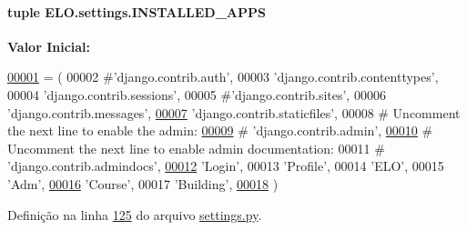 \paragraph[{I\+N\+S\+T\+A\+L\+L\+E\+D\+\_\+\+A\+P\+P\+S}]{\setlength{\rightskip}{0pt plus 5cm}tuple E\+L\+O.\+settings.\+I\+N\+S\+T\+A\+L\+L\+E\+D\+\_\+\+A\+P\+P\+S}\label{namespaceELO_1_1settings_a1a4752075da59d93477195bcc3fc4765}
{\bfseries Valor Inicial\+:}
\begin{DoxyCode}
\hypertarget{namespaceELO_1_1settings_l00001}{}\hyperlink{namespaceELO_1_1settings}{00001} = (
00002     \textcolor{comment}{#'django.contrib.auth',}
00003     \textcolor{stringliteral}{'django.contrib.contenttypes'},
00004     \textcolor{stringliteral}{'django.contrib.sessions'},
00005     \textcolor{comment}{#'django.contrib.sites',}
00006     \textcolor{stringliteral}{'django.contrib.messages'},
\hypertarget{namespaceELO_1_1settings_l00007}{}\hyperlink{namespaceELO_1_1settings_a7730264ddd478343e0f282f36d4a5ab4}{00007}     \textcolor{stringliteral}{'django.contrib.staticfiles'},
00008     \textcolor{comment}{# Uncomment the next line to enable the admin:}
\hypertarget{namespaceELO_1_1settings_l00009}{}\hyperlink{namespaceELO_1_1settings_a62f457ac29cc6f3e85282c71ce3b4f26}{00009}     \textcolor{comment}{# 'django.contrib.admin',}
\hypertarget{namespaceELO_1_1settings_l00010}{}\hyperlink{namespaceELO_1_1settings_a014930e0bf77feccc65c20212593381e}{00010}     \textcolor{comment}{# Uncomment the next line to enable admin documentation:}
00011     \textcolor{comment}{# 'django.contrib.admindocs',}
\hypertarget{namespaceELO_1_1settings_l00012}{}\hyperlink{namespaceELO_1_1settings_a051220bd8105ba13b2720df11c1950ba}{00012}     \textcolor{stringliteral}{'Login'},
00013     \textcolor{stringliteral}{'Profile'},
00014     \textcolor{stringliteral}{'ELO'},
00015     \textcolor{stringliteral}{'Adm'},
\hypertarget{namespaceELO_1_1settings_l00016}{}\hyperlink{namespaceELO_1_1settings_a43e8826e0b24e337065b4975f3eace4c}{00016}     \textcolor{stringliteral}{'Course'},
00017     \textcolor{stringliteral}{'Building'},
\hypertarget{namespaceELO_1_1settings_l00018}{}\hyperlink{namespaceELO_1_1settings_a91ed1425b7f1cf041960832ce5b54b6e}{00018} )
\end{DoxyCode}


Definição na linha \hyperlink{settings_8py_source_l00125}{125} do arquivo \hyperlink{settings_8py_source}{settings.\+py}.

\hypertarget{namespaceELO_1_1settings_a388841a63bae5418e55fb741f938d4fb}{}
